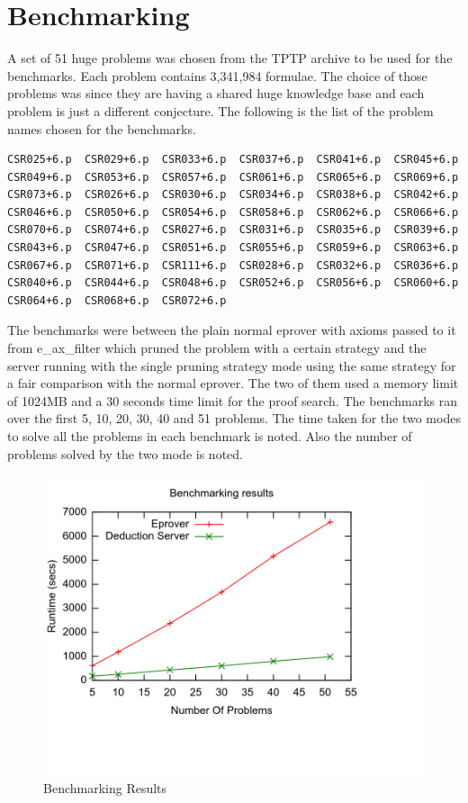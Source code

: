 \chapter{Benchmarking}

A set of 51 huge problems was chosen from the TPTP archive to be used for the benchmarks. Each problem contains 3,341,984 formulae. The choice of those problems was since they are having a shared huge knowledge base and each problem is just a different conjecture. The following is the list of the problem names chosen for the benchmarks.

\begin{lstlisting}
CSR025+6.p  CSR029+6.p  CSR033+6.p  CSR037+6.p  CSR041+6.p  CSR045+6.p  CSR049+6.p  CSR053+6.p  CSR057+6.p  CSR061+6.p  CSR065+6.p  CSR069+6.p  CSR073+6.p  CSR026+6.p  CSR030+6.p  CSR034+6.p  CSR038+6.p  CSR042+6.p  CSR046+6.p  CSR050+6.p  CSR054+6.p  CSR058+6.p  CSR062+6.p  CSR066+6.p  CSR070+6.p  CSR074+6.p  CSR027+6.p  CSR031+6.p  CSR035+6.p  CSR039+6.p  CSR043+6.p  CSR047+6.p  CSR051+6.p  CSR055+6.p  CSR059+6.p  CSR063+6.p  CSR067+6.p  CSR071+6.p  CSR111+6.p  CSR028+6.p  CSR032+6.p  CSR036+6.p  CSR040+6.p  CSR044+6.p  CSR048+6.p  CSR052+6.p  CSR056+6.p  CSR060+6.p  CSR064+6.p  CSR068+6.p  CSR072+6.p
\end{lstlisting}

The benchmarks were between the plain normal eprover with axioms passed to it from e\_ax\_filter which pruned the problem with a certain strategy and the server running with the single pruning strategy mode using the same strategy for a fair comparison with the normal eprover. The two of them used a memory limit of 1024MB and a 30 seconds time limit for the proof search. The benchmarks ran over the first 5, 10, 20, 30, 40 and 51 problems. The time taken for the two modes to solve all the problems in each benchmark is noted. Also the number of problems solved by the two mode is noted.

\begin{figure}[ht!]
  \centering
  \includegraphics[width=150mm]{graphics/BenchmarkingResults.png}
  \caption{Benchmarking Results\label{benchmarking_results}}
\end{figure}

